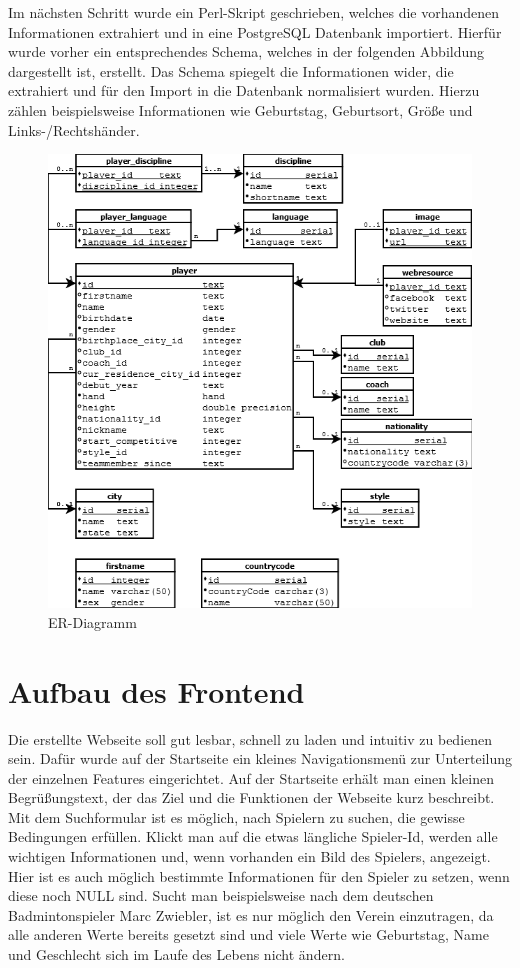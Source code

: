\documentclass[12pt,a4paper]{scrreprt}
\begin{document}
Im nächsten Schritt wurde ein Perl-Skript geschrieben, welches die vorhandenen Informationen extrahiert und in eine PostgreSQL Datenbank importiert. Hierfür wurde vorher ein entsprechendes Schema, welches in der folgenden Abbildung dargestellt ist, erstellt. Das Schema spiegelt die Informationen wider, die extrahiert und für den Import in die Datenbank normalisiert wurden. Hierzu zählen beispielsweise Informationen wie Geburtstag, Geburtsort, Größe und Links-/Rechtshänder.

\begin{figure}[H]
\centering
\includegraphics[width=1\textwidth] {ER-Diagramm} 
\caption{ER-Diagramm}
\label{fig:ER-Diagramm}
\end{figure}

\section{Aufbau des Frontend}
\label{Frontend}
Die erstellte Webseite soll gut lesbar, schnell zu laden und intuitiv zu bedienen sein. Dafür wurde auf der Startseite ein kleines Navigationsmenü zur Unterteilung der einzelnen Features eingerichtet. Auf der Startseite erhält man einen kleinen Begrüßungstext, der das Ziel und die Funktionen der Webseite kurz beschreibt. Mit dem Suchformular ist es möglich, nach Spielern zu suchen, die gewisse Bedingungen erfüllen. Klickt man auf die etwas längliche Spieler-Id, werden alle wichtigen Informationen und, wenn vorhanden ein Bild des Spielers, angezeigt. Hier ist es auch möglich bestimmte Informationen für den Spieler zu setzen, wenn diese noch \glqq NULL\grqq{} sind. Sucht man beispielsweise nach dem deutschen Badmintonspieler Marc Zwiebler, ist es nur möglich den Verein einzutragen, da alle anderen Werte bereits gesetzt sind und viele Werte wie Geburtstag, Name und Geschlecht sich im Laufe des Lebens nicht ändern.
\end{document}
